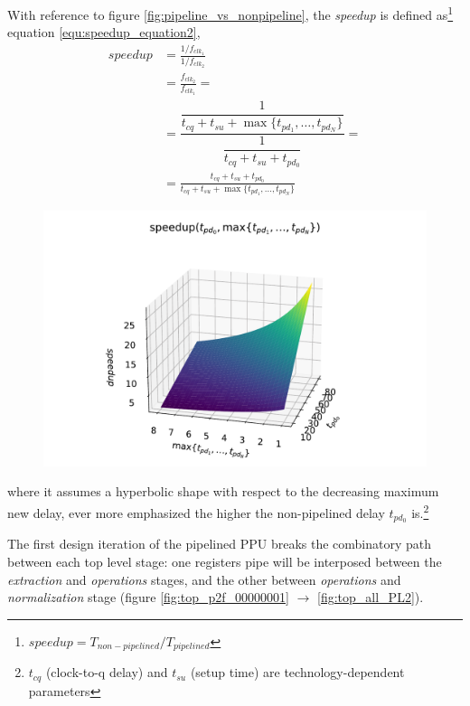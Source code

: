 With reference to figure \ref{fig:pipeline_vs_nonpipeline}, the \textit{speedup} is defined as\footnote{\cite{lilja_pipelining_2004} $speedup = T_{non-pipelined}/T_{pipelined}$} equation \ref{equ:speedup_equation2},
        \begin{equation}\label{equ:speedup_equation2}
            \begin{aligned}
                speedup &= \frac{1/f_{clk_1}}{1/f_{clk_2}} \\
                &= \frac{f_{clk_2}}{f_{clk_1}} = \\
                &= \dfrac{\dfrac{1}{t_{cq} + t_{su} + \max\{t_{pd_1}, \dots, t_{pd_N} \}}}{\dfrac{1}{t_{cq} + t_{su} + t_{pd_0}}} = \\
                &= \frac{t_{cq} + t_{su} + t_{pd_0}}{t_{cq} + t_{su} + \max\{t_{pd_1}, \dots, t_{pd_N} \}}
            \end{aligned}
        \end{equation}
        \begin{figure}
            \includegraphics[width=1\textwidth]{figures/3d_plot_speedup.pdf}
            \label{fig:speedupplot}
        \end{figure}
where it assumes a hyperbolic shape with respect to the decreasing maximum new delay, ever more emphasized the higher the non-pipelined delay $t_{pd_0}$ is.\footnote{$t_{cq}$ (clock-to-q delay) and $t_{su}$ (setup time) are technology-dependent parameters}

The first design iteration of the pipelined PPU breaks the combinatory path between each top level stage: one registers pipe will be interposed between the \textit{extraction} and \textit{operations} stages, and the other between \textit{operations} and \textit{normalization} stage (figure \ref{fig:top_p2f_00000001}  $\rightarrow$ \ref{fig:top_all_PL2}).

